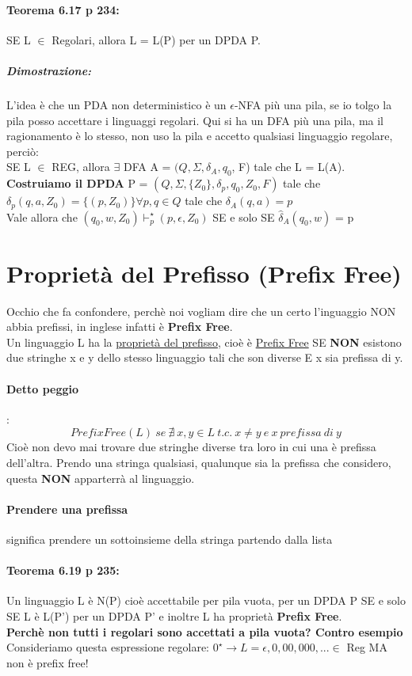 \documentclass[12pt, a4paper, openany, oneside]{book}
\begin{document}
\paragraph{Teorema 6.17 p 234:} SE L $\in$ Regolari, allora L = L(P) per un DPDA P.
\subparagraph{Dimostrazione:} L'idea è che un PDA non deterministico è un $\epsilon$-NFA
più una pila, se io tolgo la pila posso accettare i linguaggi regolari. Qui si ha
un DFA più una pila, ma il ragionamento è lo stesso, non uso la pila e accetto
qualsiasi linguaggio regolare, perciò:\\
SE L $\in$ REG, allora $\exists$ DFA A = $(Q, \Sigma, \delta_{A}, q_{0}$, F) tale che
L = L(A). \\
\textbf{Costruiamo il DPDA }P = $(Q, \Sigma, \{Z_{0}\}, \delta_{p}, q_{0}, Z_{0}, F)$
tale che $\delta_{p} (q,a, Z_{0}) = \{(p, Z_{0})\} \forall p, q \in Q$ tale che
$\delta_{A}(q,a) = p$\\
Vale allora che $(q_{0}, w, Z_{0}) \vdash^{\star}_{p} (p, \epsilon, Z_{0})$ SE e
solo SE $\widehat{\delta}_{A}(q_{0}, w)$ = p
\section{Proprietà del Prefisso (Prefix Free)}
Occhio che fa confondere, perchè noi vogliam dire che un certo l'inguaggio NON
abbia prefissi, in inglese infatti è \textbf{Prefix Free}.\\
Un linguaggio L ha la \underline{proprietà del prefisso}, cioè è \underline{Prefix Free}
SE \textbf{NON} esistono due stringhe x e y dello stesso linguaggio tali che son
diverse E x sia prefissa di y.
\paragraph{Detto peggio}:\\
\[PrefixFree(L) ~ se ~ \nexists ~ x, y \in L ~ t.c. ~ x \neq y ~ e ~ x ~ prefissa ~ di ~ y\]
Cioè non devo mai trovare due stringhe diverse tra loro in cui una è prefissa 
dell'altra. Prendo una stringa qualsiasi, qualunque sia la prefissa che considero,
questa \textbf{NON} apparterrà al linguaggio. 
\paragraph{Prendere una prefissa} significa prendere un sottoinsieme della stringa
partendo dalla lista
\paragraph{Teorema 6.19 p 235: }Un linguaggio L è N(P) cioè accettabile per pila vuota,
per un DPDA P SE e solo SE L è L(P') per un DPDA P' e inoltre L ha proprietà 
\textbf{Prefix Free}.\\
\textbf{Perchè non tutti i regolari sono accettati a pila vuota? Contro esempio}\\
Consideriamo questa espressione regolare: $0^{\star} \to L = {\epsilon, 0, 00, 000, ...}
\in$ Reg MA non è prefix free! 
\end{document}
